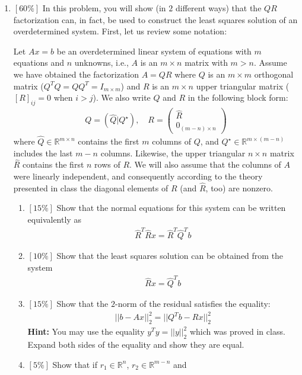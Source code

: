 \documentclass{article}
\begin{document}
\begin{enumerate}
\item $[60\%]$ In this problem, you will show (in $2$ different ways) that the
$QR$ factorization can, in fact, be used to construct the least squares solution
of an overdetermined system. First, let us review some notation:

\noindent Let $Ax=b$ be an overdetermined linear system of equations with $m$
equations and $n$ unknowns, i.e., $A$ is an $m\times n$ matrix with $m>n$.
Assume we have obtained the factorization $A=QR$ where $Q$ is an $m\times m$
orthogonal matrix ($Q^TQ=QQ^T=I_{m\times m}$) and $R$ is an $m\times n$ upper
triangular matrix ($[R]_{ij}=0$ when $i>j$). We also write $Q$ and $R$ in the
following block form:
\begin{eqnarray*}
Q=\left(\hat Q|Q^\star\right), \enspace\enspace R=\left(
\begin{array}{c}
\hat R \\
0_{(m-n)\times n}
\end{array}
\right)
\end{eqnarray*}
where $\hat Q\in\mathbb R^{m\times n}$ contains the first $m$ columns of $Q$,
and $Q^\star\in\mathbb R^{m\times (m-n)}$ includes the last $m-n$ columns.
Likewise, the upper triangular $n\times n$ matrix $\hat R$ contains the first
$n$ rows of $R$. We will also assume that the columns of $A$ were linearly
independent, and consequently according to the theory presented in class the
diagonal elements of $R$ (and $\hat R$, too) are nonzero.
\begin{enumerate}
\item $[15\%]$ Show that the normal equations for this system can be written
equivalently as
\begin{eqnarray*}
\hat R^T\hat Rx=\hat R^T\hat Q^Tb
\end{eqnarray*}
\item $[10\%]$ Show that the least squares solution can be obtained from the
system
\begin{eqnarray*}
\hat Rx=\hat Q^Tb
\end{eqnarray*}
\item $[15\%]$ Show that the $2$-norm of the residual satisfies the equality:
\begin{eqnarray*}
||b-Ax||_2^2=||Q^Tb-Rx||_2^2
\end{eqnarray*}
\textbf{Hint:} You may use the equality $y^Ty=||y||_2^2$ which was proved in
class. Expand both sides of the equality and show they are equal.
\item $[5\%]$ Show that if $r_1\in\mathbb R^n$, $r_2\in\mathbb R^{m-n}$ and

\end{enumerate}
\end{enumerate}
\end{document}
